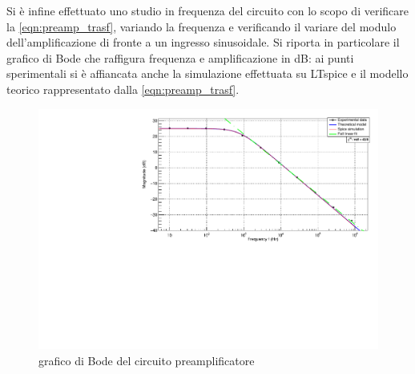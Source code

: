 \documentclass{article}
\begin{document}
Si è infine effettuato uno studio in frequenza del circuito con lo scopo di verificare la \ref{eqn:preamp_trasf}, variando la frequenza
e verificando il variare del modulo dell'amplificazione di fronte a un ingresso sinusoidale.
Si riporta in particolare il grafico di Bode che raffigura frequenza e amplificazione in dB: ai punti sperimentali si è affiancata
anche la simulazione effettuata su LTspice e il modello teorico rappresentato dalla \ref{eqn:preamp_trasf}.

\begin{center}
\begin{figure}[H]
\centering
\includegraphics[scale=0.4, angle=0]{bodepreamp.pdf}
\caption{grafico di Bode del circuito preamplificatore}
\label{fig:bodepreamp}
\end{figure}
\end{center}



\end{document}
